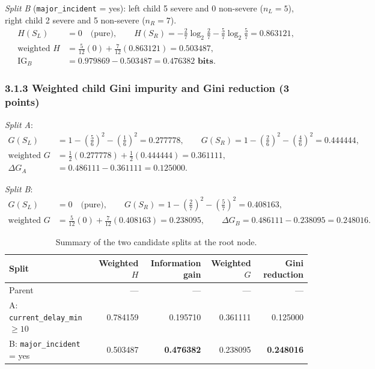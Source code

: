 \documentclass[11pt,a4paper]{article}
\newcommand{\code}[1]{\texttt{#1}}
\begin{document}
\emph{Split B} (\code{major\_incident} = yes): left child 5 severe and 0 non-severe
($n_L = 5$), right child 2 severe and 5 non-severe ($n_R = 7$).
\begin{align*}
H(S_L) &= 0 \quad\text{(pure)}, \qquad
H(S_R)  = -\tfrac27\log_2\tfrac27 - \tfrac57\log_2\tfrac57 = 0.863121, \\
\text{weighted } H &= \tfrac{5}{12}(0) + \tfrac{7}{12}(0.863121) = 0.503487, \\
\mathrm{IG}_B &= 0.979869 - 0.503487 = \mathbf{0.476382 \text{ bits}}.
\end{align*}

\subsubsection*{3.1.3 Weighted child Gini impurity and Gini reduction (3 points)}

\emph{Split A}:
\begin{align*}
G(S_L) &= 1 - \left(\tfrac56\right)^2 - \left(\tfrac16\right)^2 = 0.277778, \qquad
G(S_R)  = 1 - \left(\tfrac26\right)^2 - \left(\tfrac46\right)^2 = 0.444444, \\
\text{weighted } G &= \tfrac12(0.277778) + \tfrac12(0.444444) = 0.361111, \\
\Delta G_A &= 0.486111 - 0.361111 = \mathbf{0.125000}.
\end{align*}

\emph{Split B}:
\begin{align*}
G(S_L) &= 0 \quad\text{(pure)}, \qquad
G(S_R)  = 1 - \left(\tfrac27\right)^2 - \left(\tfrac57\right)^2 = 0.408163, \\
\text{weighted } G &= \tfrac{5}{12}(0) + \tfrac{7}{12}(0.408163) = 0.238095, \qquad
\Delta G_B = 0.486111 - 0.238095 = \mathbf{0.248016}.
\end{align*}

\begin{table}[H]
\centering
\caption{Summary of the two candidate splits at the root node.}
\label{tab:splits}
\small
\begin{tabular}{lrrrr}
\toprule
Split & Weighted $H$ & Information gain & Weighted $G$ & Gini reduction \\
\midrule
Parent & --- & --- & --- & --- \\
A: \code{current\_delay\_min} $\ge 10$ & 0.784159 & 0.195710 & 0.361111 & 0.125000 \\
B: \code{major\_incident} = yes        & 0.503487 & \textbf{0.476382} & 0.238095 & \textbf{0.248016} \\
\bottomrule
\end{tabular}
\end{table}
\end{document}
